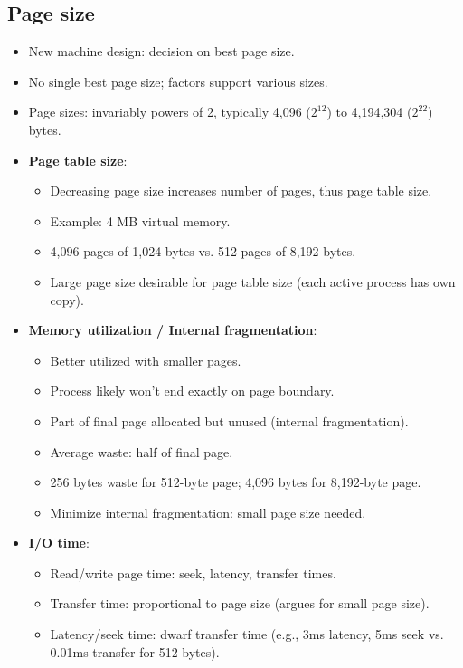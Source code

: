 \subsection{Page size}
\begin{itemize}
    \item New machine design: decision on best page size.
    \item No single best page size; factors support various sizes.
    \item Page sizes: invariably powers of 2, typically 4,096 ($2^{12}$) to 4,194,304 ($2^{22}$) bytes.
    \item \textbf{Page table size}:
    \begin{itemize}
        \item Decreasing page size increases number of pages, thus page table size.
        \item Example: 4 MB virtual memory.
        \item 4,096 pages of 1,024 bytes vs. 512 pages of 8,192 bytes.
        \item Large page size desirable for page table size (each active process has own copy).
    \end{itemize}
    \item \textbf{Memory utilization / Internal fragmentation}:
    \begin{itemize}
        \item Better utilized with smaller pages.
        \item Process likely won't end exactly on page boundary.
        \item Part of final page allocated but unused (internal fragmentation).
        \item Average waste: half of final page.
        \item 256 bytes waste for 512-byte page; 4,096 bytes for 8,192-byte page.
        \item Minimize internal fragmentation: small page size needed.
    \end{itemize}
    \item \textbf{I/O time}:
    \begin{itemize}
        \item Read/write page time: seek, latency, transfer times.
        \item Transfer time: proportional to page size (argues for small page size).
        \item Latency/seek time: dwarf transfer time (e.g., 3ms latency, 5ms seek vs. 0.01ms transfer for 512 bytes).

\end{itemize}
\end{itemize}
